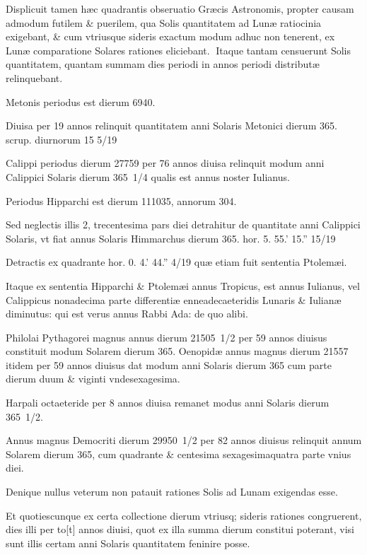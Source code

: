 \begin{parnumbers}

Displicuit tamen hæc quadrantis obseruatio Græcis Astronomis, propter causam admodum futilem  \& puerilem, qua Solis quantitatem ad Lunæ ratiocinia exigebant, \& cum vtriusque sideris exactum modum adhuc non tenerent, ex Lunæ comparatione Solares rationes eliciebant.
Itaque tantam censuerunt Solis quantitatem, quantam summam dies periodi in annos periodi distributæ relinquebant.

Metonis periodus est dierum 6940.

Diuisa per 19 annos relinquit quantitatem anni Solaris Metonici dierum 365. scrup. diurnorum 15 5/19

Calippi periodus dierum 27759 per 76 annos diuisa relinquit modum anni Calippici Solaris dierum 365 1/4 qualis est annus noster Iulianus.

Periodus Hipparchi est dierum 111035, annorum 304.

Sed neglectis illis 2, trecentesima pars diei detrahitur de quantitate anni Calippici Solaris,  vt fiat annus Solaris Himmarchus dierum 365. hor. 5. 55.' 15.'' 15/19

Detractis ex quadrante hor. 0. 4.' 44.'' 4/19 quæ etiam fuit sententia Ptolemæi.

Itaque ex sententia Hipparchi \& Ptolemæi annus Tropicus, est annus Iulianus, vel Calippicus nonadecima parte differentiæ enneadecaeteridis Lunaris \& Iulianæ diminutus: qui est verus annus Rabbi Ada: de quo alibi.

Philolai Pythagorei magnus annus dierum 21505 1/2 per 59 annos diuisus constituit modum Solarem dierum 365. Oenopidæ annus magnus dierum 21557 itidem per 59 annos diuisus dat modum anni Solaris dierum 365 cum parte dierum duum \& viginti vndesexagesima.

Harpali octaeteride per 8 annos diuisa remanet modus anni Solaris dierum 365 1/2.

Annus magnus  Democriti dierum 29950 1/2 per 82 annos diuisus relinquit annum Solarem dierum 365, cum quadrante \& centesima sexagesimaquatra parte vnius diei.

Denique nullus veterum non patauit rationes Solis ad Lunam exigendas esse.

Et quotiescunque ex certa collectione dierum vtriusq; sideris rationes congruerent, dies illi per to[t] annos diuisi, quot ex illa summa dierum constitui poterant, visi sunt illis certam anni Solaris quantitatem feninire posse.


\end{parnumbers}
